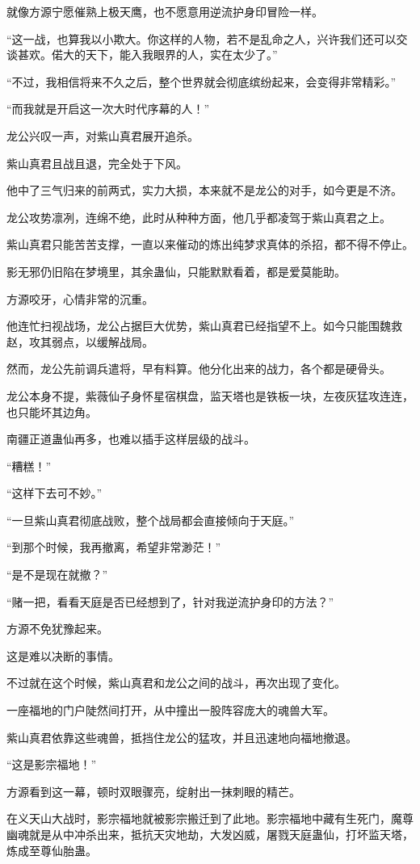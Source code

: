 \begin{this_body}
就像方源宁愿催熟上极天鹰，也不愿意用逆流护身印冒险一样。

“这一战，也算我以小欺大。你这样的人物，若不是乱命之人，兴许我们还可以交谈甚欢。偌大的天下，能入我眼界的人，实在太少了。”

“不过，我相信将来不久之后，整个世界就会彻底缤纷起来，会变得非常精彩。”

“而我就是开启这一次大时代序幕的人！”

龙公兴叹一声，对紫山真君展开追杀。

紫山真君且战且退，完全处于下风。

他中了三气归来的前两式，实力大损，本来就不是龙公的对手，如今更是不济。

龙公攻势凛冽，连绵不绝，此时从种种方面，他几乎都凌驾于紫山真君之上。

紫山真君只能苦苦支撑，一直以来催动的炼出纯梦求真体的杀招，都不得不停止。

影无邪仍旧陷在梦境里，其余蛊仙，只能默默看着，都是爱莫能助。

方源咬牙，心情非常的沉重。

他连忙扫视战场，龙公占据巨大优势，紫山真君已经指望不上。如今只能围魏救赵，攻其弱点，以缓解战局。

然而，龙公先前调兵遣将，早有料算。他分化出来的战力，各个都是硬骨头。

龙公本身不提，紫薇仙子身怀星宿棋盘，监天塔也是铁板一块，左夜灰猛攻连连，也只能坏其边角。

南疆正道蛊仙再多，也难以插手这样层级的战斗。

“糟糕！”

“这样下去可不妙。”

“一旦紫山真君彻底战败，整个战局都会直接倾向于天庭。”

“到那个时候，我再撤离，希望非常渺茫！”

“是不是现在就撤？”

“赌一把，看看天庭是否已经想到了，针对我逆流护身印的方法？”

方源不免犹豫起来。

这是难以决断的事情。

不过就在这个时候，紫山真君和龙公之间的战斗，再次出现了变化。

一座福地的门户陡然间打开，从中撞出一股阵容庞大的魂兽大军。

紫山真君依靠这些魂兽，抵挡住龙公的猛攻，并且迅速地向福地撤退。

“这是影宗福地！”

方源看到这一幕，顿时双眼骤亮，绽射出一抹刺眼的精芒。

在义天山大战时，影宗福地就被影宗搬迁到了此地。影宗福地中藏有生死门，魔尊幽魂就是从中冲杀出来，抵抗天灾地劫，大发凶威，屠戮天庭蛊仙，打坏监天塔，炼成至尊仙胎蛊。


\end{this_body}
